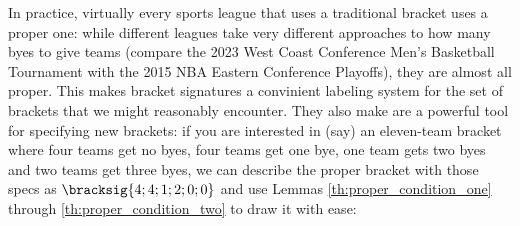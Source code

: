 {%



In practice, virtually every sports league that uses a traditional bracket uses a proper one: while different leagues take very different approaches to how many byes to give teams (compare the 2023 West Coast Conference Men's Basketball Tournament with the 2015 NBA Eastern Conference Playoffs), they are almost all proper. This makes bracket signatures a convinient labeling system for the set of brackets that we might reasonably encounter. They also make are a powerful tool for specifying new brackets: if you are interested in (say) an eleven-team bracket where four teams get no byes, four teams get one bye, one team gets two byes and two teams get three byes, we can describe the proper bracket with those specs as $\bracksig{4; 4; 1; 2; 0; 0}$ and use Lemmas \ref{th:proper_condition_one} through \ref{th:proper_condition_two} to draw it with ease:

}